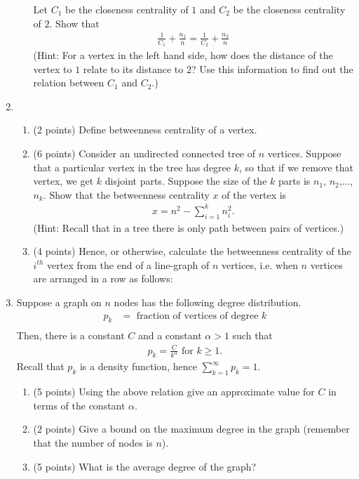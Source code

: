 \documentclass[a4paper,10pt]{article}
\begin{document}
\begin{enumerate}
\begin{enumerate}
Let $C_1$ be the closeness
centrality of $1$ and $C_2$ be the closeness centrality of $2$. Show that
\begin{align*}
\frac{1}{C_1} + \frac{n_1}{n} = \frac{1}{C_2} + \frac{n_2}{n}
\end{align*}
(Hint: For a vertex in the left hand side, how does the distance of the vertex to $1$ relate to its distance to $2$? 
Use this information to find out the relation between $C_1$ and $C_2$.) 

\end{enumerate}

\item 
\begin{enumerate}
\item (2 points) Define betweenness centrality of a vertex. 
\item (6 points) Consider an undirected connected tree of $n$ vertices. 
Suppose that a particular vertex in the tree has degree $k$, so that if we remove that vertex, we get $k$ disjoint parts.
Suppose the size of the $k$ parts is $n_1$, $n_2$,...,$n_k$. Show that the betweenness centrality $x$ of the vertex
is 
\begin{align*}
 x = n^2 - \sum_{i=1}^k n_i^2.
\end{align*}
(Hint: Recall that in a tree there is only path between pairs of vertices.)
\item (4 points) Hence, or otherwise, calculate the betweenness centrality of the $i^{th}$ vertex from the end of a line-graph
of $n$ vertices, i.e. when $n$ vertices are arranged in a row as follows:
\vspace*{1.5in}
\end{enumerate}


\item Suppose a graph on $n$ nodes has the following degree distribution. 
\begin{align*}
 p_k &= \mbox{ fraction of vertices of degree } k\\
\end{align*}
Then, there is a constant $C$ and a constant $\alpha> 1$ such that
\begin{align*}
 p_k = \frac{C}{k^\alpha} \mbox{ for } k \ge 1.
\end{align*}
Recall that $p_k$ is a density function, hence $\sum_{k=1}^{\infty} p_k = 1$. 
\begin{enumerate}
\item (5 points) Using the above relation give an approximate value for $C$ in terms of the constant $\alpha$.
\item (2 points) Give a bound on the maximum degree in the graph (remember that the number of nodes is $n$).
\item (5 points) What is the average degree of the graph?
\end{enumerate}


\end{enumerate}
\end{document}
